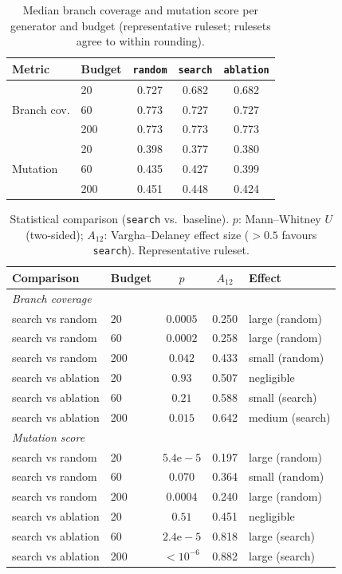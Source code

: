 \documentclass[conference]{IEEEtran}
\begin{document}
\begin{table}[t]
\centering
\caption{Median branch coverage and mutation score per generator and budget
(representative ruleset; rulesets agree to within rounding).}
\label{tab:medians}
\begin{tabular}{llccc}
\toprule
Metric & Budget & \texttt{random} & \texttt{search} & \texttt{ablation} \\
\midrule
\multirow{3}{*}{Branch cov.}
 & 20  & 0.727 & 0.682 & 0.682 \\
 & 60  & 0.773 & 0.727 & 0.727 \\
 & 200 & 0.773 & 0.773 & 0.773 \\
\midrule
\multirow{3}{*}{Mutation}
 & 20  & 0.398 & 0.377 & 0.380 \\
 & 60  & 0.435 & 0.427 & 0.399 \\
 & 200 & 0.451 & 0.448 & 0.424 \\
\bottomrule
\end{tabular}
\end{table}

\begin{table}[t]
\centering
\caption{Statistical comparison (\texttt{search} vs.\ baseline). $p$:
Mann--Whitney $U$ (two-sided); $A_{12}$: Vargha--Delaney effect size
($>0.5$ favours \texttt{search}). Representative ruleset.}
\label{tab:stats}
\setlength{\tabcolsep}{4pt}
\begin{tabular}{llccl}
\toprule
Comparison & Budget & $p$ & $A_{12}$ & Effect \\
\midrule
\multicolumn{5}{l}{\emph{Branch coverage}}\\
search vs random   & 20  & $0.0005$ & 0.250 & large (random) \\
search vs random   & 60  & $0.0002$ & 0.258 & large (random) \\
search vs random   & 200 & $0.042$  & 0.433 & small (random) \\
search vs ablation & 20  & $0.93$   & 0.507 & negligible \\
search vs ablation & 60  & $0.21$   & 0.588 & small (search) \\
search vs ablation & 200 & $0.015$  & 0.642 & medium (search) \\
\midrule
\multicolumn{5}{l}{\emph{Mutation score}}\\
search vs random   & 20  & $5.4\mathrm{e}{-}5$ & 0.197 & large (random) \\
search vs random   & 60  & $0.070$  & 0.364 & small (random) \\
search vs random   & 200 & $0.0004$ & 0.240 & large (random) \\
search vs ablation & 20  & $0.51$   & 0.451 & negligible \\
search vs ablation & 60  & $2.4\mathrm{e}{-}5$ & 0.818 & large (search) \\
search vs ablation & 200 & $<\!10^{-6}$ & 0.882 & large (search) \\
\bottomrule
\end{tabular}
\end{table}
\end{document}
